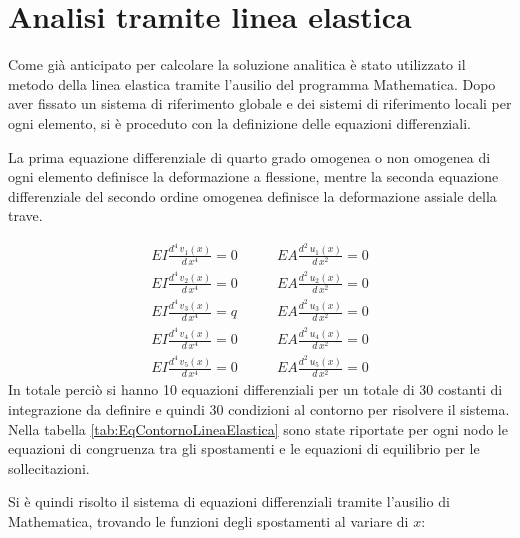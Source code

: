 \pagebreak
\section{Analisi tramite linea elastica}
Come già anticipato per calcolare la soluzione analitica è stato utilizzato il metodo della linea elastica tramite l'ausilio del programma Mathematica.
Dopo aver fissato un sistema di riferimento globale e dei sistemi di riferimento locali per ogni elemento, si è proceduto con la definizione delle equazioni differenziali. 

La prima equazione differenziale di quarto grado omogenea o non omogenea di ogni elemento definisce la deformazione a flessione, mentre la seconda equazione differenziale del secondo ordine omogenea definisce la deformazione assiale della trave.

{\footnotesize{
\begin{align*}
    EI\frac{d^4\,v_1(x)}{d\,x^4} = 0 &\qquad
    EA\frac{d^2\,u_1(x)}{d\,x^2} = 0 \\
    EI\frac{d^4\,v_2(x)}{d\,x^4} = 0 &\qquad
    EA\frac{d^2\,u_2(x)}{d\,x^2} = 0 \\
    EI\frac{d^4\,v_3(x)}{d\,x^4} = q &\qquad
    EA\frac{d^2\,u_3(x)}{d\,x^2} = 0 \\
    EI\frac{d^4\,v_4(x)}{d\,x^4} = 0 &\qquad
    EA\frac{d^2\,u_4(x)}{d\,x^2} = 0 \\
    EI\frac{d^4\,v_5(x)}{d\,x^4} = 0 &\qquad
    EA\frac{d^2\,u_5(x)}{d\,x^2} = 0 
\end{align*}}}
In totale perciò si hanno 10 equazioni differenziali per un totale di 30 costanti di integrazione da definire e quindi 30 condizioni al contorno per risolvere il sistema.
Nella tabella \ref{tab:EqContornoLineaElastica} sono state riportate per ogni nodo le equazioni di congruenza tra gli spostamenti e le equazioni di equilibrio per le sollecitazioni.


Si è quindi risolto il sistema di equazioni differenziali tramite l'ausilio di Mathematica, trovando le funzioni degli spostamenti al variare di $x$:


